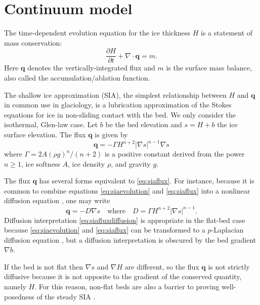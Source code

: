 \documentclass[twocolumn,a4paper]{igs}
\newcommand\bq{\mathbf{q}}
\newcommand{\Div}{\nabla\cdot}
\newcommand{\grad}{\nabla}
\begin{document}
\section{Continuum model}

The time-dependent evolution equation for the ice thickness $H$ is a statement of mass conservation:
\begin{equation}
\frac{\partial H}{\partial t} + \Div \bq = m.  \label{eq:siaevolution}
\end{equation}
Here $\bq$ denotes the vertically-integrated flux and $m$ is the surface mass balance, also called the accumulation/ablation function.

The shallow ice approximation (SIA), the simplest relationship between $H$ and $\bq$ in common use in glaciology, is a lubrication approximation \citep{Fowler1997} of the Stokes equations for ice in non-sliding contact with the bed.  We only consider the isothermal, Glen-law \citep{GreveBlatter2009} case.  Let $b$ be the bed elevation and $s = H+b$ the ice surface elevation.  The flux $\bq$ is given by
\begin{equation}
\bq = - \Gamma H^{n+2} |\grad s|^{n-1} \grad s  \label{eq:siaflux}
\end{equation}
where $\Gamma = 2 A (\rho g)^n / (n+2)$ is a positive constant derived from the power $n\ge 1$, ice softness $A$, ice density $\rho$, and gravity $g$.

The flux $\bq$ has several forms equivalent to \eqref{eq:siaflux}.  For instance, because it is common to combine equations \eqref{eq:siaevolution} and \eqref{eq:siaflux} into a nonlinear diffusion equation \citep{Huybrechtsetal1996}, one may write
\begin{equation}
\bq = - D \grad s \quad \text{where} \quad D =  \Gamma H^{n+2} |\grad s|^{n-1}. \label{eq:siafluxdiffusion}
\end{equation}
Diffusion interpretation \eqref{eq:siafluxdiffusion} is appropriate in the flat-bed case because \eqref{eq:siaevolution} and \eqref{eq:siaflux} can be transformed to a $p$-Laplacian diffusion equation \citep{Calvoetal2002}, but a diffusion interpretation is obscured by the bed gradient $\grad b$.

If the bed is not flat then $\grad s$ and $\grad H$ are different, so the flux $\bq$ is not strictly diffusive because it is not opposite to the gradient of the conserved quantity, namely $H$.  For this reason, non-flat beds are also a barrier to proving well-posedness of the steady SIA  \citep{JouvetBueler2012}.
\end{document}
